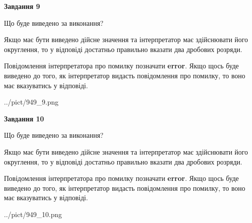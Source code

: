 \documentclass[12pt, ukrainian]{article}
\begin{document}
{\begin {Large}
{\begin {center}\textbf{Завдання 9}\end {center}}\par
Що буде виведено за виконання? \par

Якщо має бути виведено дійсне значення та інтерпретатор має здійснювати його округлення, 
то у відповіді достатньо правильно вказати два дробових розряди.

Повідомлення інтерпретатора про помилку позначати \textbf{error}.
Якщо щось буде виведено до того, як інтерпретатор видасть повідомлення про помилку, 
то воно має вказуватись у відповіді. \par

\begin{center}
	{../pict/949_9.png}
\end{center}
\newpage

{\begin {center}\textbf{Завдання 10}\end {center}}\par
Що буде виведено за виконання? \par

Якщо має бути виведено дійсне значення та інтерпретатор має здійснювати його округлення, 
то у відповіді достатньо правильно вказати два дробових розряди.

Повідомлення інтерпретатора про помилку позначати \textbf{error}.
Якщо щось буде виведено до того, як інтерпретатор видасть повідомлення про помилку, 
то воно має вказуватись у відповіді. \par

\begin{center}
	{../pict/949_10.png}
\end{center}
\newpage

\end {Large}}
\end{document}
